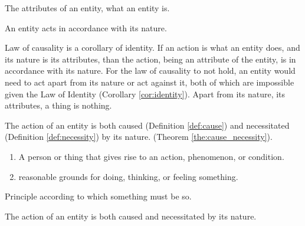             \begin{definition}[Nature]
            \label{def:nature}
                The attributes of an entity, what an entity is.
            \end{definition}
        
            \begin{corollary}
            \label{cor:causality}
                An entity acts in accordance with its nature.
            \end{corollary}

            \begin{remark}
                Law of causality is a corollary of identity. If an action is what an entity does, and its nature is its attributes, than the action, being an attribute of the entity, is in accordance with its nature. For the law of causality to not hold, an entity would need to act apart from its nature or act against it, both of which are impossible given the Law of Identity (Corollary \ref{cor:identity}). Apart from its nature, its attributes, a thing is nothing.
            \end{remark}
            
        The action of an entity is both caused (Definition \ref{def:cause}) and necessitated (Definition \ref{def:necessity}) by its nature. (Theorem \ref{the:cause_necessity}).

            \begin{definition}[Cause]
            \label{def:cause}
                \begin{enumerate}
                    \item A person or thing that gives rise to an action, phenomenon, or condition.
                    \item reasonable grounds for doing, thinking, or feeling something.
                \end{enumerate}
            \end{definition}
        
            \begin{definition}[Necessity]
            \label{def:necessity}
                Principle according to which something must be so.
            \end{definition}

            \begin{theorem}
            \label{the:cause_necessity}
                The action of an entity is both caused and necessitated by its nature.
            \end{theorem}


